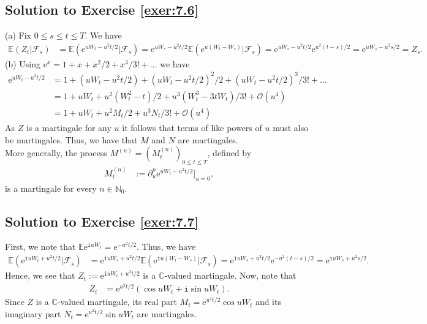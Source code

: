\documentclass[12pt]{book}
\numberwithin{equation}{chapter}
\theoremstyle{plain}
\numberwithin{theorem}{section}
\theoremstyle{definition}
\numberwithin{exercise}{chapter}
\newcommand{\<}{\langle}
\renewcommand{\>}{\rangle}
\renewcommand{\(}{\left(}
\renewcommand{\)}{\right)}
\renewcommand{\[}{\left[}
\renewcommand{\]}{\right]}
\newcommand\Cb{\mathds{C}}
\newcommand\Eb{\mathds{E}}
\newcommand\Nb{\mathds{N}}
\newcommand\Fc{\mathscr{F}}
\newcommand\Oc{\mathscr{O}}
\renewcommand\d{\partial}
\newcommand\ii{\mathtt{i}}
\newcommand\ee{\mathrm{e}}
\begin{document}
\subsection*{Solution to Exercise \ref{exer:7.6}}
(a) Fix $0 \leq s \leq t \leq T$.  We have
\begin{align}
\Eb( Z_t | \Fc_s )
	&=	\Eb( \ee^{u W_t - u^2 t / 2} | \Fc_s )
	=		\ee^{u W_s - u^2 t / 2} \Eb( \ee^{u ( W_t - W_s)} | \Fc_s )
	=		\ee^{u W_s - u^2 t / 2} \ee^{u^2 (t-s)/2}
	=		\ee^{u W_s - u^2 s / 2}
	=		Z_s .
\end{align}
(b) Using $\ee^x = 1 + x + x^2 / 2 + x^3/3! + \ldots$ we have
\begin{align}
\ee^{u W_t - u^2 t / 2}
	&=	1 + ( u W_t - u^2 t / 2 ) + (u W_t - u^2 t / 2 )^2 / 2 + (u W_t - u^2 t / 2 )^3 / 3! + \ldots \\
	&=	1 + u W_t + u^2 (W_t^2 - t) / 2 + u^3 (W_t^3 - 3 t W_t) / 3! + \Oc(u^4) \\
	&=	1 + u W_t + u^2 M_t / 2 + u^3 N_t / 3! + \Oc(u^4)
\end{align}
As $Z$ is a martingale for any $u$ it follows that terms of like powers of $u$ must also be martingales.  Thus, we have that $M$ and $N$ are martingales.
\\[0.5em]
More generally, the process $M^{(n)}=(M_t^{(n)})_{0 \leq t \leq T}$, defined by
\begin{align}
M_t^{(n)}
	&:=	\d_u^n \ee^{u W_t - u^2 t / 2} \Big|_{u = 0} ,
\end{align}
is a martingale for every $n \in \Nb_0$.

\subsection*{Solution to Exercise \ref{exer:7.7}}
First, we note that $\Eb \ee^{\ii u W_t} = \ee^{ - u^2 t / 2}$.  Thus, we have
\begin{align}
\Eb( \ee^{\ii u W_t + u^2 t / 2} | \Fc_s )
	&=	\ee^{ \ii u W_s + u^2 t / 2} \Eb( \ee^{\ii u ( W_t - W_s ) } | \Fc_s )
	=		\ee^{ \ii u W_s + u^2 t / 2} \ee^{- u^2 ( t-s )/2 }
	=		\ee^{ \ii u W_s + u^2 s / 2} .
\end{align}
Hence, we see that $Z_t := \ee^{\ii u W_t + u^2 t / 2}$ is a $\Cb$-valued martingale.  Now, note that
\begin{align}
Z_t
	&=	\ee^{ u^2 t / 2} ( \cos u W_t + \ii \sin u W_t ) .
\end{align}
Since $Z$ is a $\Cb$-valued martingale, its real part $M_t = \ee^{ u^2 t / 2} \cos u W_t$ and its imaginary part $N_t = \ee^{ u^2 t / 2} \sin u W_t$ are martingales.
\end{document}
